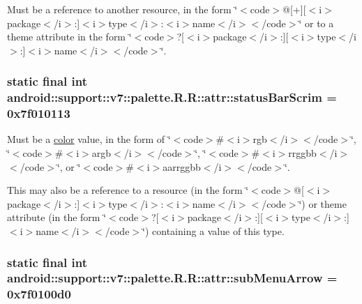 Must be a reference to another resource, in the form \char`\"{}$<$code$>$@\mbox{[}+\mbox{]}\mbox{[}$<$i$>$package$<$/i$>$:\mbox{]}$<$i$>$type$<$/i$>$:$<$i$>$name$<$/i$>$$<$/code$>$\char`\"{} or to a theme attribute in the form \char`\"{}$<$code$>$?\mbox{[}$<$i$>$package$<$/i$>$:\mbox{]}\mbox{[}$<$i$>$type$<$/i$>$:\mbox{]}$<$i$>$name$<$/i$>$$<$/code$>$\char`\"{}. \hypertarget{classandroid_1_1support_1_1v7_1_1palette_1_1_r_1_1attr_9b2028c054532d4af4811d8fec9f550e}{
\subsubsection[{statusBarScrim}]{\setlength{\rightskip}{0pt plus 5cm}static final int android::support::v7::palette.R.R::attr::statusBarScrim = 0x7f010113}}
\label{classandroid_1_1support_1_1v7_1_1palette_1_1_r_1_1attr_9b2028c054532d4af4811d8fec9f550e}


Must be a \hyperlink{classandroid_1_1support_1_1v7_1_1palette_1_1_r_1_1color}{color} value, in the form of \char`\"{}$<$code$>$\#$<$i$>$rgb$<$/i$>$$<$/code$>$\char`\"{}, \char`\"{}$<$code$>$\#$<$i$>$argb$<$/i$>$$<$/code$>$\char`\"{}, \char`\"{}$<$code$>$\#$<$i$>$rrggbb$<$/i$>$$<$/code$>$\char`\"{}, or \char`\"{}$<$code$>$\#$<$i$>$aarrggbb$<$/i$>$$<$/code$>$\char`\"{}. 

This may also be a reference to a resource (in the form \char`\"{}$<$code$>$@\mbox{[}$<$i$>$package$<$/i$>$:\mbox{]}$<$i$>$type$<$/i$>$:$<$i$>$name$<$/i$>$$<$/code$>$\char`\"{}) or theme attribute (in the form \char`\"{}$<$code$>$?\mbox{[}$<$i$>$package$<$/i$>$:\mbox{]}\mbox{[}$<$i$>$type$<$/i$>$:\mbox{]}$<$i$>$name$<$/i$>$$<$/code$>$\char`\"{}) containing a value of this type. \hypertarget{classandroid_1_1support_1_1v7_1_1palette_1_1_r_1_1attr_091a2ffc65b3eda9e7938cbace4b20f0}{
\subsubsection[{subMenuArrow}]{\setlength{\rightskip}{0pt plus 5cm}static final int android::support::v7::palette.R.R::attr::subMenuArrow = 0x7f0100d0}}
\label{classandroid_1_1support_1_1v7_1_1palette_1_1_r_1_1attr_091a2ffc65b3eda9e7938cbace4b20f0}



